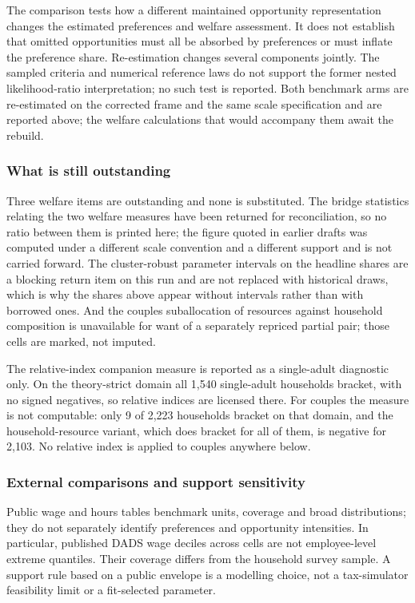 \documentclass[11pt,a4paper]{article}
\begin{document}
The comparison tests how a different maintained opportunity representation changes the estimated preferences and welfare assessment. It does not establish that omitted opportunities must all be absorbed by preferences or must inflate the preference share. Re-estimation changes several components jointly. The sampled criteria and numerical reference laws do not support the former nested likelihood-ratio interpretation; no such test is reported. Both benchmark arms are re-estimated on the corrected frame and the same scale specification and are reported above; the welfare calculations that would accompany them await the rebuild.

\subsubsection{What is still outstanding}\label{what-is-still-outstanding}

Three welfare items are outstanding and none is substituted. The bridge statistics relating the two welfare measures have been returned for reconciliation, so no ratio between them is printed here; the figure quoted in earlier drafts was computed under a different scale convention and a different support and is not carried forward. The cluster-robust parameter intervals on the headline shares are a blocking return item on this run and are not replaced with historical draws, which is why the shares above appear without intervals rather than with borrowed ones. And the couples suballocation of resources against household composition is unavailable for want of a separately repriced partial pair; those cells are marked, not imputed.

The relative-index companion measure is reported as a single-adult diagnostic only. On the theory-strict domain all 1,540 single-adult households bracket, with no signed negatives, so relative indices are licensed there. For couples the measure is not computable: only 9 of 2,223 households bracket on that domain, and the household-resource variant, which does bracket for all of them, is negative for 2,103. No relative index is applied to couples anywhere below.

\subsubsection{External comparisons and support sensitivity}\label{external-comparisons-and-support-sensitivity}

Public wage and hours tables benchmark units, coverage and broad distributions; they do not separately identify preferences and opportunity intensities. In particular, published DADS wage deciles across cells are not employee-level extreme quantiles. Their coverage differs from the household survey sample. A support rule based on a public envelope is a modelling choice, not a tax-simulator feasibility limit or a fit-selected parameter.
\end{document}
